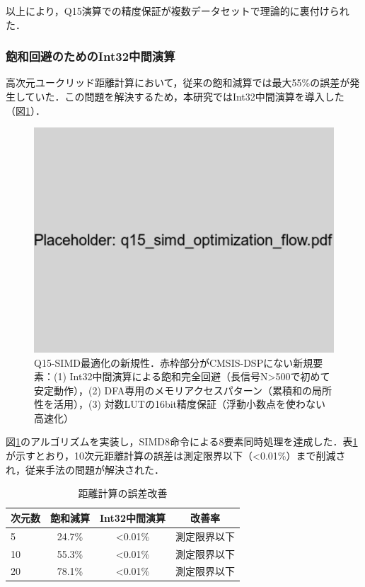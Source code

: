 \documentclass[paper]{ieicej}
\begin{document}
以上により，Q15演算での精度保証が複数データセットで理論的に裏付けられた．

\subsubsection{飽和回避のためのInt32中間演算}
高次元ユークリッド距離計算において，従来の飽和減算では最大55\%の誤差が発生していた．この問題を解決するため，本研究ではInt32中間演算を導入した（図\ref{fig:flowchart}）．

\begin{figure}[t]
\centering
\includegraphics[width=0.85\linewidth]{q15_simd_optimization_flow.pdf}
\caption{Q15-SIMD最適化の新規性．赤枠部分がCMSIS-DSPにない新規要素：(1) Int32中間演算による飽和完全回避（長信号N>500で初めて安定動作），(2) DFA専用のメモリアクセスパターン（累積和の局所性を活用），(3) 対数LUTの16bit精度保証（浮動小数点を使わない高速化）}
\label{fig:flowchart}
\end{figure}

図\ref{fig:flowchart}のアルゴリズムを実装し，SIMD8命令による8要素同時処理を達成した．表\ref{tab:distance_error}が示すとおり，10次元距離計算の誤差は測定限界以下（<0.01\%）まで削減され，従来手法の問題が解決された．

\begin{table}[t]
\caption{距離計算の誤差改善}
\label{tab:distance_error}
\centering
\begin{tabular}{lccc}
\toprule
次元数 & 飽和減算 & Int32中間演算 & 改善率 \\
\midrule
5 & 24.7\% & <0.01\% & 測定限界以下 \\
10 & 55.3\% & <0.01\% & 測定限界以下 \\
20 & 78.1\% & <0.01\% & 測定限界以下 \\
\bottomrule
\end{tabular}
\end{table}
\end{document}
